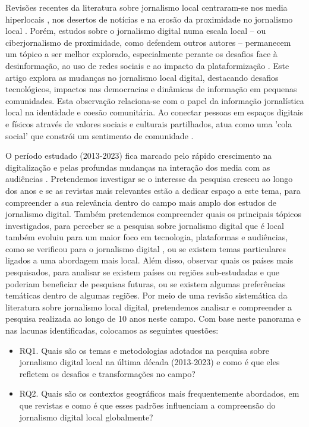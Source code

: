 \documentclass[portuguese]{textolivre}
\begin{document}
Revisões recentes da literatura sobre jornalismo local centraram-se nos media hiperlocais \cite{negreira-rey2021, negreira-rey_amigo2022}, nos desertos de notícias \cite{rodriguezurra2024} e na erosão da proximidade no jornalismo local \cite{mota2023}. Porém, estudos sobre o jornalismo digital numa escala local – ou ciberjornalismo de proximidade, como defendem outros autores \cite{lopez-garcia2008, jeronimo2015} – permanecem um tópico a ser melhor explorado, especialmente perante os desafios face à desinformação, ao uso de redes sociais e ao impacto da plataformização \cite{poell2020plataformizacao, morais2023}. Este artigo explora as mudanças no jornalismo local digital, destacando desafios tecnológicos, impactos nas democracias e dinâmicas de informação em pequenas comunidades. Esta observação relaciona-se com o papel da informação jornalística local na identidade e coesão comunitária. Ao conectar pessoas em espaços digitais e físicos através de valores sociais e culturais partilhados, atua como uma 'cola social' que constrói um sentimento de comunidade \cite{hess2015}.

O período estudado (2013-2023) fica marcado pelo rápido crescimento na digitalização e pelas profundas mudanças na interação dos media com as audiências \cite{heiselberg2024}. Pretendemos investigar se o interesse da pesquisa cresceu ao longo dos anos e se as revistas mais relevantes estão a dedicar espaço a este tema, para compreender a sua relevância dentro do campo mais amplo dos estudos de jornalismo digital. Também pretendemos compreender quais os principais tópicos investigados, para perceber se a pesquisa sobre jornalismo digital que é local também evoluiu para um maior foco em tecnologia, plataformas e audiências, como se verificou para o jornalismo digital \cite{steensen2019}, ou se existem temas particulares ligados a uma abordagem mais local. Além disso, observar quais os países mais pesquisados, para analisar se existem países ou regiões sub-estudadas e que poderiam beneficiar de pesquisas futuras, ou se existem algumas preferências temáticas dentro de algumas regiões. Por meio de uma revisão sistemática da literatura sobre jornalismo local digital, pretendemos analisar e compreender a pesquisa realizada ao longo de 10 anos neste campo. Com base neste panorama e nas lacunas identificadas, colocamos as seguintes questões:

\begin{itemize}
    \item RQ1. Quais são os temas e metodologias adotados na pesquisa sobre jornalismo digital local na última década (2013-2023) e como é que eles refletem os desafios e transformações no campo?
    \item RQ2. Quais são os contextos geográficos mais frequentemente abordados, em que revistas e como é que esses padrões influenciam a compreensão do jornalismo digital local globalmente? 
\end{itemize}
\end{document}
